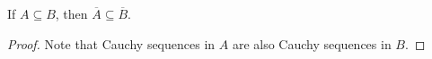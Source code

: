 \begin{corollary}
  If $A \subseteq B$, then $\overline{A} \subseteq \overline{B}$.
\end{corollary}

\begin{proof}
  Note that
  Cauchy sequences in $A$ are also Cauchy sequences in $B$.
\end{proof}
